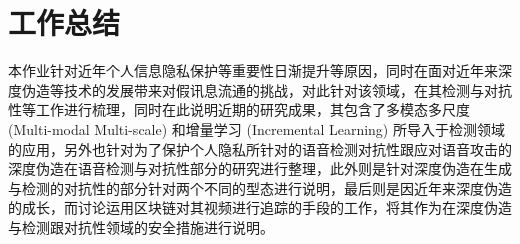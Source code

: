 \chapter{工作总结}
\label{chap:2}

本作业针对近年个人信息隐私保护等重要性日渐提升等原因，同时在面对近年来深度伪造等技术的发展带来对假讯息流通的挑战，对此针对该领域，在其检测与对抗性等工作进行梳理，同时在此说明近期的研究成果，其包含了多模态多尺度(Multi-modal Multi-scale) 和增量学习 (Incremental Learning) 所导入于检测领域的应用，另外也针对为了保护个人隐私所针对的语音检测对抗性跟应对语音攻击的深度伪造在语音检测与对抗性部分的研究进行整理，此外则是针对深度伪造在生成与检测的对抗性的部分针对两个不同的型态进行说明，最后则是因近年来深度伪造的成长，而讨论运用区块链对其视频进行追踪的手段的工作，将其作为在深度伪造与检测跟对抗性领域的安全措施进行说明。








